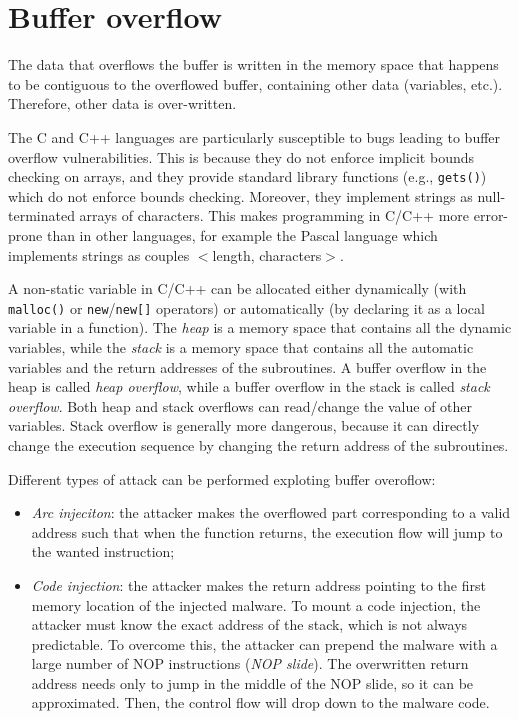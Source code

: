 \documentclass[a4paper,12pt]{article}
\begin{document}
\newpage

\appendix

\section{Buffer overflow}
The data that overflows the buffer is written in the memory space that happens to be contiguous to the overflowed buffer, containing other data (variables, etc.). Therefore, other data is over-written.

The C and C++ languages are particularly susceptible to bugs leading to buffer overflow vulnerabilities. This is because they do not enforce implicit bounds checking on arrays, and they provide standard library functions (e.g., \texttt{gets()}) which do not enforce bounds checking. Moreover, they implement strings as null-terminated arrays of characters. This makes programming in C/C++ more error-prone than in other languages, for example the Pascal language which implements strings as couples $<$length, characters$>$.

A non-static variable in C/C++ can be allocated either dynamically (with \texttt{malloc()} or \texttt{new}/\texttt{new[]} operators) or automatically (by declaring it as a local variable in a function). The \textit{heap} is a memory space that contains all the dynamic variables, while the \textit{stack} is a memory space that contains all the automatic variables and the return addresses of the subroutines. A buffer overflow in the heap is called \textit{heap overflow}, while a buffer overflow in the stack is called \textit{stack overflow}. Both heap and stack overflows can read/change the value of other variables. Stack overflow is generally more dangerous, because it can directly change the execution sequence by changing the return address of the subroutines.

Different types of attack can be performed exploting buffer overoflow:
\begin{itemize}
	\item \textit{Arc injeciton}: the attacker makes the overflowed part corresponding to a valid address such that when the function returns, the execution flow will jump to the wanted instruction;
	\item \textit{Code injection}: the attacker makes the return address pointing to the first memory location of the injected malware. To mount a code injection, the attacker must know the exact address of the stack, which is not always predictable. To overcome this, the attacker can prepend the malware with a large number of NOP instructions (\textit{NOP slide}). The overwritten return address needs only to jump in the middle of the NOP slide, so it can be approximated. Then, the control flow will drop down to the malware code.
\end{itemize}
\end{document}
